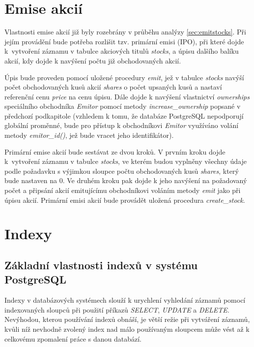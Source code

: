 \documentclass[thesis=M,czech]{FITthesis}[2012/06/26]
\begin{document}
\section{Emise akcií}

Vlastnosti emise akcií již byly rozebrány v průběhu analýzy \ref{sec:emitstocks}. Při jejím provádění bude potřeba rozlišit tzv. primární emisi (IPO), při které 
dojde k~vytvoření záznamu v tabulce akciových titulů \textit{stocks}, a úpisu dalšího balíku akcií, kdy dojde k navýšení počtu již obchodovaných akcií.

Úpis bude proveden pomocí uložené procedury \textit{emit}, jež v tabulce \textit{stocks} navýší počet obchodovaných kusů akcií \textit{shares} o počet 
upsaných kusů a nastaví referenční cenu \textit{price} na cenu úpisu. Dále dojde k navýšení vlastnictví \textit{ownerships} speciálního obchodníka 
\textit{Emitor} pomocí metody \textit{increase\_ownership} popsané v předchozí podkapitole (vzhledem k tomu, že databáze PostgreSQL nepodporují 
globální proměnné, bude pro přístup k obchodníkovi \textit{Emitor} využíváno volání metody \textit{emitor\_id()}, jež bude vracet jeho identifikátor). 

Primární emise akcií bude sestávat ze dvou kroků. V prvním kroku dojde k~vytvoření záznamu v tabulce \textit{stocks}, ve kterém budou vyplněny 
všechny údaje podle požadavku s výjimkou sloupce počtu obchodovaných kusů \textit{shares}, který bude nastaven na 0. Ve druhém kroku pak dojde 
k jeho navýšení na požadovaný počet a připsání akcií emitujícímu obchodníkovi voláním metody \textit{emit} jako při úpisu akcií. Primární emisi akcií bude 
provádět uložená procedura \textit{create\_stock}.


\section{Indexy}


\subsection{Základní vlastnosti indexů v systému PostgreSQL}

Indexy v databázových systémech slouží k urychlení vyhledání záznamů pomocí indexovaných sloupců při použití příkazů \textit{SELECT}, \textit{UPDATE} a 
\textit{DELETE}. Nevýhodou, kterou používání indexů obnáší, je větší režie při vytváření záznamů, kvůli níž nevhodně zvolený index nad málo používaným 
sloupcem může vést až k celkovému zpomalení práce s danou databází.
\end{document}

